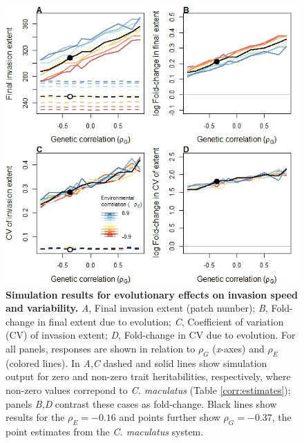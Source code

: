 \documentclass[11pt]{article}
\begin{document}
\begin{figure}[h!]
\centering
\includegraphics[width=0.75\linewidth]{Figures/sim_invasions_default_h2_4panel}
\caption{\textbf{Simulation results for evolutionary effects on invasion speed and variability.}
\textit{A}, Final invasion extent (patch number); \textit{B}, Fold-change in final extent due to evolution; \textit{C}, Coefficient of variation (CV) of invasion extent; \textit{D}, Fold-change in CV due to evolution.
For all panels, responses are shown in relation to $\rho_{G}$ (\textit{x}-axes) and $\rho_{E}$ (colored lines).
In \textit{A},\textit{C} dashed and solid lines show simulation output for zero and non-zero trait heritabilities, respectively, where non-zero values correpond to \textit{C. maculatus} (Table \ref{corr:estimates}); panels \textit{B},\textit{D} contrast these cases as fold-change.
Black lines show results for the $\rho_{E} = -0.16$ and points further show $\rho_{G} = -0.37$, the point estimates from the \textit{C. maculatus} system.}
\label{corr:sim_default}
\end{figure}
\end{document}
